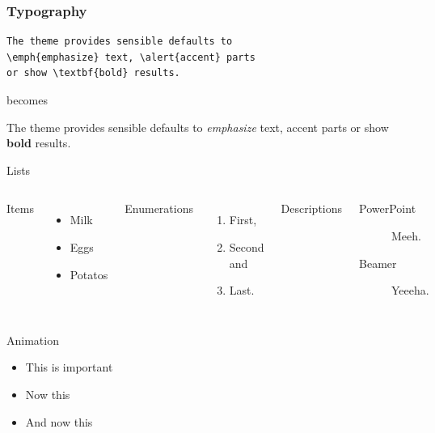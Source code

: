 \documentclass[10pt]{beamer}
\begin{document}
	
	
	









\begin{frame}[fragile]
  \frametitle{Typography}
      \begin{verbatim}The theme provides sensible defaults to
\emph{emphasize} text, \alert{accent} parts
or show \textbf{bold} results.\end{verbatim}

  \begin{center}becomes\end{center}

  The theme provides sensible defaults to \emph{emphasize} text,
  \alert{accent} parts or show \textbf{bold} results.
\end{frame}
\begin{frame}{Lists}
  \begin{columns}[T,onlytextwidth]
      Items
      \begin{itemize}
        \item Milk \item Eggs \item Potatos
      \end{itemize}

      Enumerations
      \begin{enumerate}
        \item First, \item Second and \item Last.
      \end{enumerate}

      Descriptions
      \begin{description}
        \item[PowerPoint] Meeh. \item[Beamer] Yeeeha.
      \end{description}
  \end{columns}
\end{frame}
\begin{frame}{Animation}
  \begin{itemize}[<+- | alert@+>]
    \item \alert<4>{This is important}
    \item Now this
    \item And now this
  \end{itemize}
\end{frame}
\end{document}
